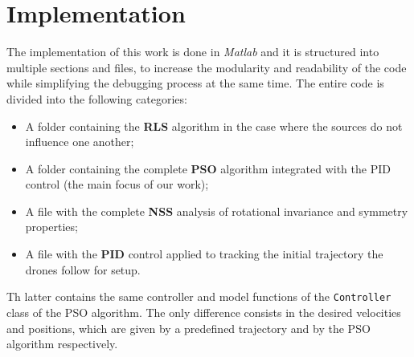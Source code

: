 \section{Implementation}
The implementation of this work is done in \textit{Matlab} and it
is structured into multiple sections and files, to increase the modularity and 
readability of the code while simplifying the debugging process at the same time. 
The entire code is divided into the following categories:
\begin{itemize}
    \item A folder containing the \textbf{RLS} algorithm in the case where the sources
    do not influence one another;
    \item A folder containing the complete \textbf{PSO} algorithm integrated with 
    the PID control (the main focus of our work);
    \item A file with the complete \textbf{NSS} analysis of rotational invariance
    and symmetry properties;
    \item A file with the \textbf{PID} control applied to tracking the initial trajectory
    the drones follow for setup.
\end{itemize}
Th latter contains the same controller and model functions of the \texttt{Controller}
class of the PSO algorithm. The only difference consists in the desired velocities and positions, 
which are given by a predefined trajectory and by the PSO algorithm
respectively.

